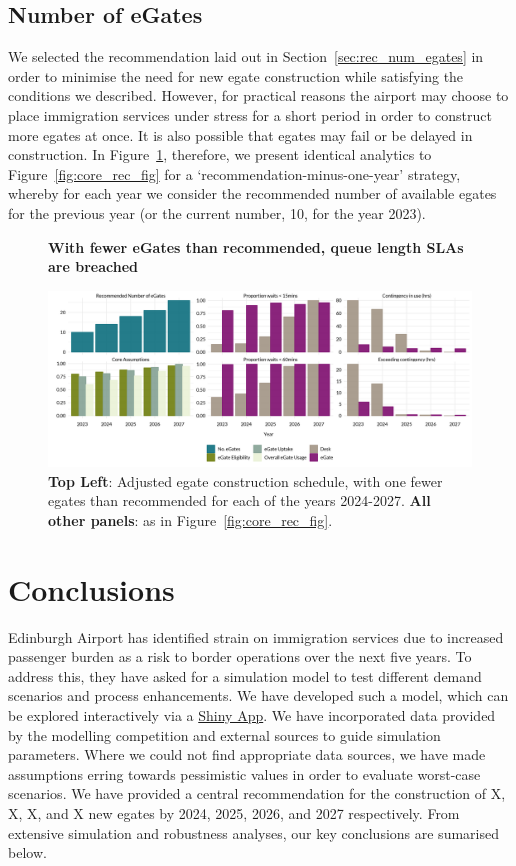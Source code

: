 \documentclass[10pt]{article}
\newcommand*{\figuretitle}[1]{%
    {\centering%
    \textbf{#1}%
    \par\medskip}%
}
\begin{document}
\subsection{Number of eGates}
We selected the recommendation laid out in Section~\ref{sec:rec_num_egates} in order to minimise the need for new \gls{egate} construction while satisfying the conditions we described. However, for practical reasons the airport may choose to place immigration services under stress for a short period in order to construct more \glspl{egate} at once. It is also possible that \glspl{egate} may fail or be delayed in construction. In Figure~\ref{fig:minus_core_rec_fig}, therefore, we present identical analytics to Figure~\ref{fig:core_rec_fig} for a `recommendation-minus-one-year' strategy, whereby for each year we consider the recommended number of available \glspl{egate} for the previous year (or the current number, 10, for the year 2023).

\begin{figure}[!ht]
    \centering
    \figuretitle{With fewer eGates than recommended, queue length SLAs are breached}
    \includegraphics[width=\textwidth]{figures/minus_core_rec_fig.png}
     \caption{\textbf{Top Left}: Adjusted \gls{egate} construction schedule, with one fewer \glspl{egate} than recommended for each of the years 2024-2027. \textbf{All other panels}: as in Figure~\ref{fig:core_rec_fig}.} \label{fig:minus_core_rec_fig}
\end{figure}

\section{Conclusions}
Edinburgh Airport has identified strain on immigration services due to increased passenger burden as a risk to border operations over the next five years. To address this, they have asked for a simulation model to test different demand scenarios and process enhancements. We have developed such a model, which can be explored interactively via a \href{https://jacob-bradley.shinyapps.io/shiny/}{Shiny App}. We have incorporated data provided by the modelling competition and external sources to guide simulation parameters. Where we could not find appropriate data sources, we have made assumptions erring towards pessimistic values in order to evaluate worst-case scenarios. We have provided a central recommendation for the construction of X, X, X, and X new \glspl{egate} by 2024, 2025, 2026, and 2027 respectively. From extensive simulation and robustness analyses, our key conclusions are sumarised below.
\end{document}
